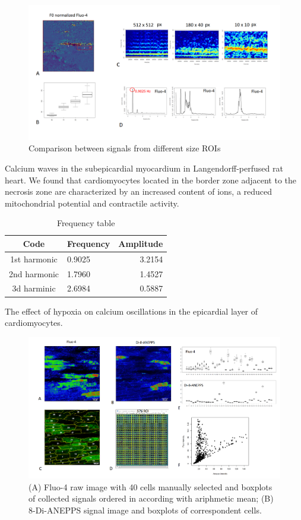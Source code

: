 \documentclass{biophys-new}
\begin{document}
\begin{figure}
    \includegraphics[width=0.9\linewidth]{fig3.png}
    \caption{Comparison between signals from different size ROIs }
    \label{fig:fig3}
\end{figure}

Calcium waves in the subepicardial myocardium in Langendorff-perfused rat heart.
We found that cardiomyocytes located in the border zone adjacent to the necrosis zone are characterized by an increased content of  ions, a reduced mitochondrial potential and contractile activity.


\begin{table}[hbt!]
\caption{Frequency table}
\label{tab:freq}
\centering
\begin{threeparttable}
\begin{tabular}{c l r}
\hline
Code & Frequency & Amplitude  \\\hline
1st harmonic & 0.9025 & 3.2154 \\
2nd harmonic & 1.7960 & 1.4527  \\
3d harminic & 2.6984 & 0.5887    \\
\hline
\end{tabular}
\begin{tablenotes}
\end{tablenotes}
\end{threeparttable}
\end{table}


The effect of hypoxia on calcium oscillations in the epicardial layer of cardiomyocytes.
\begin{figure}
    \includegraphics[width=0.9\linewidth]{fig4.png}
    \caption{(A) Fluo-4 raw image with 40 cells manually selected and  boxplots of collected signals ordered in according with ariphmetic mean; (B) 8-Di-ANEPPS signal image and boxplots of correspondent cells.}
    \label{fig:fig4}
\end{figure}
\end{document}
